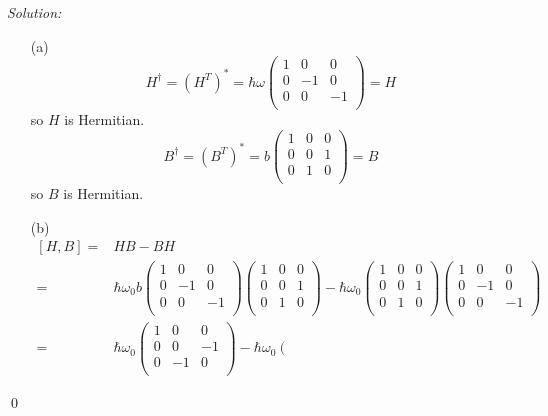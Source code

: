 \documentclass[12pt,a4paper]{article}
\newenvironment{sol}
    {\emph{Solution:}
    }
    {
    \qed
    }
\begin{document}
\begin{sol}
\begin{itemize}
\item[(a)]
\begin{equation}
H^{\dagger}=(H^T)^*=\hbar\omega\left(\begin{array}{ccc}
1&0&0\\
0&-1&0\\
0&0&-1\\
\end{array}\right)=H
\end{equation}
so $H$ is Hermitian.
\begin{equation}
B^{\dagger}=(B^T)^*=b\left(\begin{array}{ccc}
1&0&0\\
0&0&1\\
0&1&0\\
\end{array}\right)=B
\end{equation}
so $B$ is Hermitian.
\item[(b)]
\begin{align}
\nonumber[H,B]=&HB-BH\\
\nonumber=&\hbar\omega_0b\left(\begin{array}{ccc}
1&0&0\\
0&-1&0\\
0&0&-1\\
\end{array}\right)\left(\begin{array}{ccc}
1&0&0\\
0&0&1\\
0&1&0\\
\end{array}\right)-\hbar\omega_0\left(\begin{array}{ccc}
1&0&0\\
0&0&1\\
0&1&0\\
\end{array}\right)\left(\begin{array}{ccc}
1&0&0\\
0&-1&0\\
0&0&-1\\
\end{array}\right)\\
=&\hbar\omega_0\left(\begin{array}{ccc}
1&0&0\\
0&0&-1\\
0&-1&0\\
\end{array}\right)-\hbar\omega_0\left(\begin{array}{ccc}

\end{array}
\end{align}
\end{itemize}
\end{sol}
\end{document}

